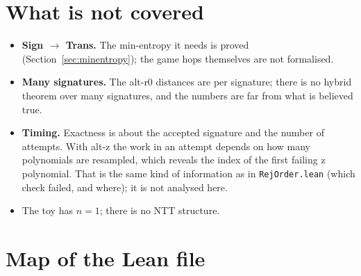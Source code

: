 \documentclass[11pt]{article}
\theoremstyle{definition}
\theoremstyle{remark}
\newcommand{\lean}[1]{\texttt{#1}}
\begin{document}
\section{What is not covered}\label{sec:notcovered}

\begin{itemize}
\item \textbf{Sign $\to$ Trans.} The min-entropy it needs is proved
  (Section~\ref{sec:minentropy}); the game hops themselves are not formalised.
\item \textbf{Many signatures.} The alt-r0 distances are per signature; there is no hybrid
  theorem over many signatures, and the numbers are far from what is believed true.
\item \textbf{Timing.} Exactness is about the accepted signature and the number of attempts. With
  alt-z the work in an attempt depends on how many polynomials are resampled, which reveals the
  index of the first failing z polynomial. That is the same kind of information as in
  \lean{RejOrder.lean} (which check failed, and where); it is not analysed here.
\item The toy has $n = 1$; there is no NTT structure.
\end{itemize}

\section{Map of the Lean file}\label{sec:map}
\end{document}
